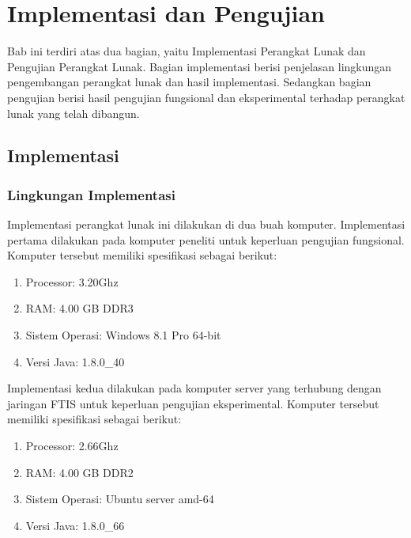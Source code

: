 \chapter{Implementasi dan Pengujian}
\label{chap:implementasiPengujian}

Bab ini terdiri atas dua bagian, yaitu Implementasi Perangkat Lunak dan Pengujian Perangkat Lunak. Bagian implementasi berisi penjelasan lingkungan pengembangan perangkat lunak dan hasil implementasi. Sedangkan bagian pengujian berisi hasil pengujian fungsional dan eksperimental terhadap perangkat lunak yang telah dibangun.

\section{Implementasi}
\label{sec:implementasi}

\subsection{Lingkungan Implementasi}
		\label{sec:lingkungan_implementasi}
			Implementasi perangkat lunak ini dilakukan di dua buah komputer. Implementasi pertama dilakukan pada komputer peneliti untuk keperluan pengujian fungsional. Komputer tersebut memiliki spesifikasi sebagai berikut:
				\begin{enumerate}
					\item Processor: 3.20Ghz 
					\item RAM: 4.00 GB DDR3	
					\item Sistem Operasi: Windows 8.1 Pro 64-bit 
					\item Versi Java: 1.8.0\_40
				\end{enumerate}
				Implementasi kedua dilakukan pada komputer server yang terhubung dengan jaringan FTIS untuk keperluan pengujian eksperimental. Komputer tersebut memiliki spesifikasi sebagai berikut:
				\begin{enumerate}
					\item Processor: 2.66Ghz 
					\item RAM: 4.00 GB DDR2	
					\item Sistem Operasi: Ubuntu server amd-64 
					\item Versi Java: 1.8.0\_66
				\end{enumerate}

